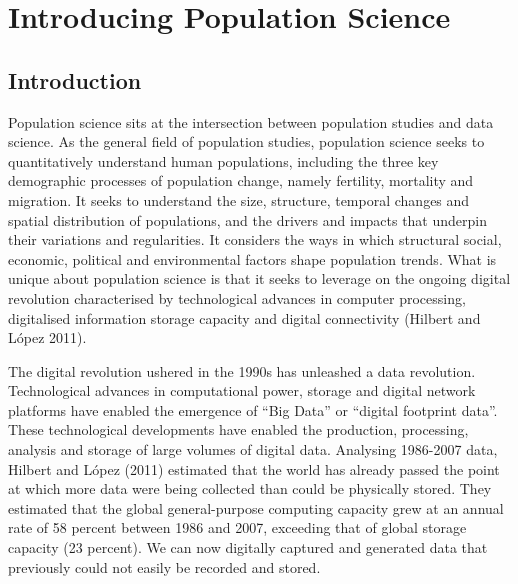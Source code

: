 \documentclass[
  letterpaper,
  DIV=11,
  numbers=noendperiod]{scrreprt}
\begin{document}

\hypertarget{sec-chp2}{%
\chapter{Introducing Population Science}\label{sec-chp2}}

\hypertarget{introduction}{%
\section{Introduction}\label{introduction}}

Population science sits at the intersection between population studies
and data science. As the general field of population studies, population
science seeks to quantitatively understand human populations, including
the three key demographic processes of population change, namely
fertility, mortality and migration. It seeks to understand the size,
structure, temporal changes and spatial distribution of populations, and
the drivers and impacts that underpin their variations and regularities.
It considers the ways in which structural social, economic, political
and environmental factors shape population trends. What is unique about
population science is that it seeks to leverage on the ongoing digital
revolution characterised by technological advances in computer
processing, digitalised information storage capacity and digital
connectivity (Hilbert and López 2011).

The digital revolution ushered in the 1990s has unleashed a data
revolution. Technological advances in computational power, storage and
digital network platforms have enabled the emergence of ``Big Data'' or
``digital footprint data''. These technological developments have
enabled the production, processing, analysis and storage of large
volumes of digital data. Analysing 1986-2007 data, Hilbert and López
(2011) estimated that the world has already passed the point at which
more data were being collected than could be physically stored. They
estimated that the global general-purpose computing capacity grew at an
annual rate of 58 percent between 1986 and 2007, exceeding that of
global storage capacity (23 percent). We can now digitally captured and
generated data that previously could not easily be recorded and stored.
\end{document}
